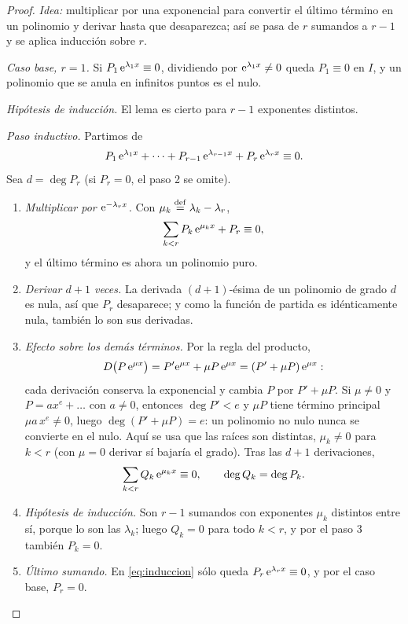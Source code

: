 \begin{proof}
\emph{Idea:} multiplicar por una exponencial para convertir el último
término en un polinomio y derivar hasta que desaparezca; así se pasa de $r$
sumandos a $r-1$ y se aplica inducción sobre $r$.

\emph{Caso base, $r=1$.} Si $P_1\,\mathrm{e}^{\lambda_1x}\equiv0$, dividiendo por
$\mathrm{e}^{\lambda_1x}\neq0$ queda $P_1\equiv0$ en $I$, y un polinomio que se anula
en infinitos puntos es el nulo.

\emph{Hipótesis de inducción.} El lema es cierto para $r-1$ exponentes
distintos.

\emph{Paso inductivo.} Partimos de
\begin{equation}\label{eq:induccion}
  P_1\,\mathrm{e}^{\lambda_1x}+\dots+P_{r-1}\,\mathrm{e}^{\lambda_{r-1}x}+P_r\,\mathrm{e}^{\lambda_rx}\equiv0 .
\end{equation}
Sea $d=\deg P_r$ (si $P_r=0$, el paso 2 se omite).
\begin{enumerate}[label=\textcolor{cian}{\arabic*.}, leftmargin=1.5em, itemsep=3pt]
  \item \emph{Multiplicar por $\mathrm{e}^{-\lambda_rx}$.} Con
        $\mu_k\mathrel{\overset{\mathrm{def}}{=}}\lambda_k-\lambda_r$,
        \[
          \sum_{k<r}P_k\,\mathrm{e}^{\mu_kx}+P_r\equiv0 ,
        \]
        y el último término es ahora un polinomio puro.
  \item \emph{Derivar $d+1$ veces.} La derivada $(d+1)$-ésima de un
        polinomio de grado $d$ es nula, así que $P_r$ desaparece; y como la
        función de partida es idénticamente nula, también lo son sus
        derivadas.
  \item \emph{Efecto sobre los demás términos.} Por la regla del producto,
        \[
          D\bigl(P\,\mathrm{e}^{\mu x}\bigr)=P'\mathrm{e}^{\mu x}+\mu P\,\mathrm{e}^{\mu x}=(P'+\mu P)\,\mathrm{e}^{\mu x}:
        \]
        cada derivación conserva la exponencial y cambia $P$ por $P'+\mu P$.
        Si $\mu\neq0$ y $P=ax^{e}+\dots$ con $a\neq0$, entonces $\deg P'<e$ y
        $\mu P$ tiene término principal $\mu a\,x^{e}\neq0$, luego
        $\deg(P'+\mu P)=e$: un polinomio no nulo nunca se convierte en el nulo.
        Aquí se usa que las raíces son distintas, $\mu_k\neq0$ para $k<r$ (con
        $\mu=0$ derivar sí bajaría el grado). Tras las $d+1$ derivaciones,
        \[
          \sum_{k<r}Q_k\,\mathrm{e}^{\mu_kx}\equiv0,\qquad \deg Q_k=\deg P_k .
        \]
  \item \emph{Hipótesis de inducción.} Son $r-1$ sumandos con exponentes
        $\mu_k$ distintos entre sí, porque lo son las $\lambda_k$; luego
        $Q_k=0$ para todo $k<r$, y por el paso 3 también $P_k=0$.
  \item \emph{Último sumando.} En \eqref{eq:induccion} sólo queda
        $P_r\,\mathrm{e}^{\lambda_rx}\equiv0$, y por el caso base, $P_r=0$.\qedhere
\end{enumerate}
\end{proof}

